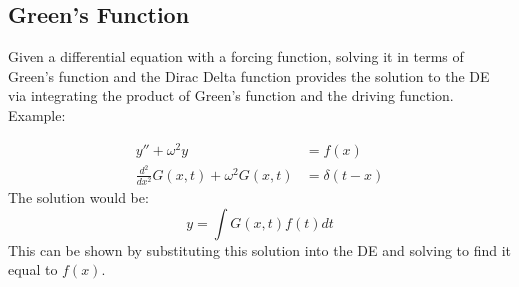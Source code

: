 \documentclass[12pt]{article}
\begin{document}
\subsection{Green's Function}
Given a differential equation with a forcing function, solving it in terms of Green's function and the Dirac Delta function provides the solution to the DE via integrating the product of Green's function and the driving function. Example:

\begin{align*}
    y''+\omega^2 y &= f(x) \\
    \frac{d^2}{dx^2}G(x,t) + \omega^2 G(x,t) &= \delta(t - x) 
\end{align*}
The solution would be:
\[y = \int G(x,t) f(t) dt\]
This can be shown by substituting this solution into the DE and solving to find it equal to $f(x)$. 
\end{document}
